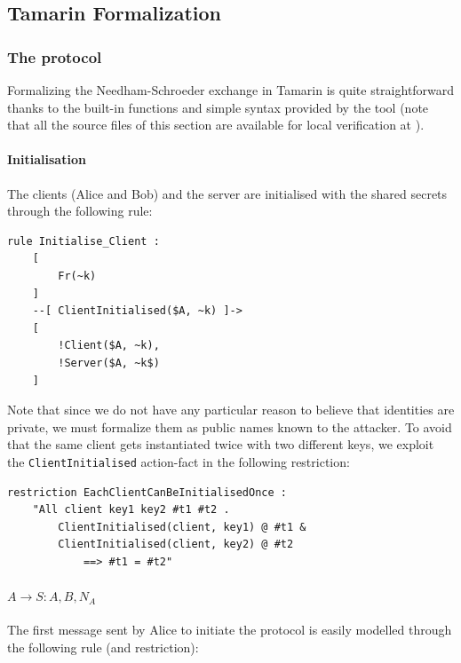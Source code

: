 \documentclass[fleqn,10pt]{SelfArx} %
\begin{document}
\subsection{Tamarin Formalization}

\subsubsection{The protocol}

Formalizing the Needham-Schroeder exchange in Tamarin is quite straightforward thanks to the built-in functions and simple syntax provided by the tool (note that all the source files of this section are available for local verification at \cite{github}).

\paragraph{Initialisation}

The clients (Alice and Bob) and the server are initialised with the shared secrets through the following rule:

\begin{lstlisting}[language=Tamarin]
rule Initialise_Client :
    [
        Fr(~k)
    ]
    --[ ClientInitialised($A, ~k) ]->
    [
        !Client($A, ~k),
        !Server($A, ~k$)
    ]
\end{lstlisting}

Note that since we do not have any particular reason to believe that identities are private, we must formalize them as public names known to the attacker. To avoid that the same client gets instantiated twice with two different keys, we exploit the \lstinline|ClientInitialised| action-fact in the following restriction:

\begin{lstlisting}[language=Tamarin]
restriction EachClientCanBeInitialisedOnce :
    "All client key1 key2 #t1 #t2 .
        ClientInitialised(client, key1) @ #t1 &
        ClientInitialised(client, key2) @ #t2
            ==> #t1 = #t2"
\end{lstlisting}

\paragraph{$A \to S: A,B,N_A$}

The first message sent by Alice to initiate the protocol is easily modelled through the following rule (and restriction):
\end{document}
